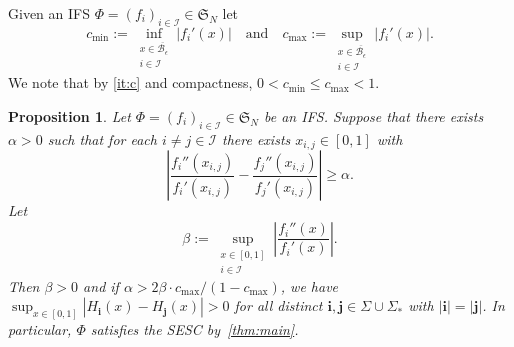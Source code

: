 \documentclass[11pt,a4paper]{article}
\def\cref#1{\ref{#1}}%
\newtheorem{proposition}[theorem]{Proposition}
\theoremstyle{definition}
\theoremstyle{remark}
\newcommand{\0}{\mathbf{0}}
\newcommand{\bi}{\mathbf{i}}
\newcommand{\bj}{\mathbf{j}}
\numberwithin{equation}{section}
\begin{document}
Given an IFS $\Phi=(f_i)_{i\in\mathcal{I}}\in\mathfrak{S}_N$ let
\begin{equation}\label{eq:maxmincontract}
  c_{\min} := \inf_{\substack{x\in\overline{\mathcal{B}_{\epsilon}} \\ i\in\mathcal{I}}}
  |f_i'(x)| \quad\text{and}\quad
  c_{\max}:=\sup_{\substack{x\in\overline{\mathcal{B}_{\epsilon}} \\ i\in\mathcal{I}}}
  |f_i'(x)|.
\end{equation}
We note that by \cref{it:c} and compactness, $0<c_{\min} \leq c_{\max} <1$.

\begin{proposition}\label{prop:example}
Let $\Phi=(f_i)_{i\in\mathcal{I}}\in\mathfrak{S}_N$ be an IFS. Suppose that there exists $\alpha>0$
such that for each $i\neq j\in\mathcal{I}$ there exists $x_{i,j}\in[0,1]$ with
\begin{equation*}
\left| \frac{f_i''(x_{i,j})}{f_i'(x_{i,j})} - \frac{f_j''(x_{i,j})}{f_j'(x_{i,j})} \right| \geq \alpha . 
\end{equation*}
Let
\begin{equation*}
  \beta:=\sup_{\substack{x\in[0,1] \\ i\in\mathcal{I}}} \left| \frac{f_i''(x)}{f_i'(x)} \right|.
\end{equation*}
Then $\beta>0$ and if $\alpha > 2\beta\cdot c_{\max}/(1-c_{\max})$, we have
$
\sup_{x\in[0,1]} |H_{\bi}(x) - H_{\bj}(x)| > 0 
$
for all distinct $\bi,\bj \in\Sigma\cup\Sigma_*$ with $|\bi|=|\bj|$. In particular, $\Phi$ satisfies
the SESC by~\cref{thm:main}.
\end{proposition}
\end{document}
